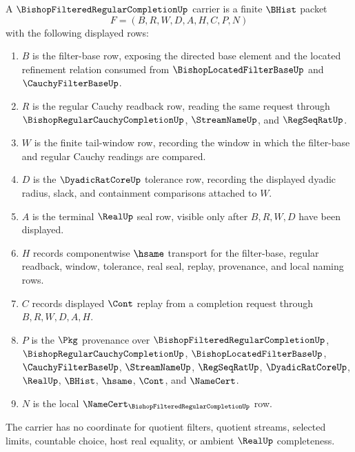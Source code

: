 \begin{definition}
\label{def:bishop-filtered-regular-completion-carrier}
A $\BishopFilteredRegularCompletionUp$ carrier is a finite $\BHist$ packet
$$
F=(B,R,W,D,A,H,C,P,N)
$$
with the following displayed rows:
\begin{enumerate}
\item $B$ is the filter-base row, exposing the directed base element and the located refinement relation consumed from $\BishopLocatedFilterBaseUp$ and $\CauchyFilterBaseUp$.
\item $R$ is the regular Cauchy readback row, reading the same request through $\BishopRegularCauchyCompletionUp$, $\StreamNameUp$, and $\RegSeqRatUp$.
\item $W$ is the finite tail-window row, recording the window in which the filter-base and regular Cauchy readings are compared.
\item $D$ is the $\DyadicRatCoreUp$ tolerance row, recording the displayed dyadic radius, slack, and containment comparisons attached to $W$.
\item $A$ is the terminal $\RealUp$ seal row, visible only after $B,R,W,D$ have been displayed.
\item $H$ records componentwise $\hsame$ transport for the filter-base, regular readback, window, tolerance, real seal, replay, provenance, and local naming rows.
\item $C$ records displayed $\Cont$ replay from a completion request through $B,R,W,D,A,H$.
\item $P$ is the $\Pkg$ provenance over $\BishopFilteredRegularCompletionUp$, $\BishopRegularCauchyCompletionUp$, $\BishopLocatedFilterBaseUp$, $\CauchyFilterBaseUp$, $\StreamNameUp$, $\RegSeqRatUp$, $\DyadicRatCoreUp$, $\RealUp$, $\BHist$, $\hsame$, $\Cont$, and $\NameCert$.
\item $N$ is the local $\NameCert_{\BishopFilteredRegularCompletionUp}$ row.
\end{enumerate}
The carrier has no coordinate for quotient filters, quotient streams, selected limits, countable choice, host real equality, or ambient $\RealUp$ completeness.
\end{definition}

